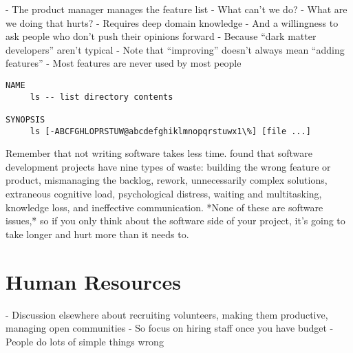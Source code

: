 \documentclass[10pt,letterpaper]{article}
\begin{document}
- The product manager manages the feature list
  - What can't we do?
  - What are we doing that hurts?
- Requires deep domain knowledge
  - And a willingness to ask people who don't push their opinions forward
  - Because ``dark matter developers'' aren't typical \cite{Hanselman2012}
- Note that ``improving'' doesn't always mean ``adding features'' \cite{Perri2018}
  - Most features are never used by most people \cite{Xu2015}

\begin{verbatim}
NAME
     ls -- list directory contents

SYNOPSIS
     ls [-ABCFGHLOPRSTUW@abcdefghiklmnopqrstuwx1\%] [file ...]
\end{verbatim}

Remember that not writing software takes less time.  \cite{Sedano2017}
found that software development projects have nine types of waste:
building the wrong feature or product, mismanaging the backlog,
rework, unnecessarily complex solutions, extraneous cognitive load,
psychological distress, waiting and multitasking, knowledge loss, and
ineffective communication.  *None of these are software issues,* so if
you only think about the software side of your project, it's going to
take longer and hurt more than it needs to.

\section{Human Resources}

- Discussion elsewhere about recruiting volunteers, making them productive, managing open communities \cite{Sholler2019}
  - So focus on hiring staff once you have budget
- People do lots of simple things wrong \cite{Behroozi2020}
\end{document}

